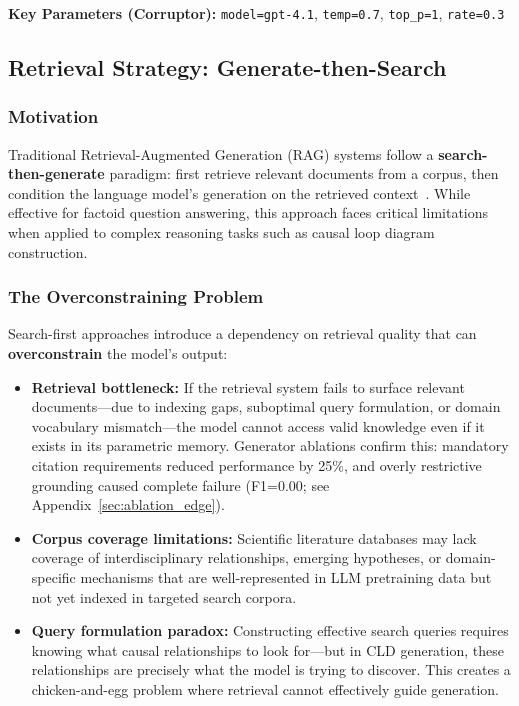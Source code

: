 \textbf{Key Parameters (Corruptor):} \texttt{model=gpt-4.1}, \texttt{temp=0.7}, \texttt{top\_p=1}, \texttt{rate=0.3}

\subsection{Retrieval Strategy: Generate-then-Search}
\label{sec:retrieval_strategy}

\subsubsection{Motivation}

Traditional Retrieval-Augmented Generation (RAG) systems follow a \textbf{search-then-generate} paradigm: first retrieve relevant documents from a corpus, then condition the language model's generation on the retrieved context~\cite{lewis2020rag}. While effective for factoid question answering, this approach faces critical limitations when applied to complex reasoning tasks such as causal loop diagram construction.

\subsubsection{The Overconstraining Problem}

Search-first approaches introduce a dependency on retrieval quality that can \textbf{overconstrain} the model's output:

\begin{itemize}[noitemsep]
    \item \textbf{Retrieval bottleneck:} If the retrieval system fails to surface relevant documents---due to indexing gaps, suboptimal query formulation, or domain vocabulary mismatch---the model cannot access valid knowledge even if it exists in its parametric memory. Generator ablations confirm this: mandatory citation requirements reduced performance by 25\%, and overly restrictive grounding caused complete failure (F1=0.00; see Appendix~\ref{sec:ablation_edge}).
    \item \textbf{Corpus coverage limitations:} Scientific literature databases may lack coverage of interdisciplinary relationships, emerging hypotheses, or domain-specific mechanisms that are well-represented in LLM pretraining data but not yet indexed in targeted search corpora.
    \item \textbf{Query formulation paradox:} Constructing effective search queries requires knowing what causal relationships to look for---but in CLD generation, these relationships are precisely what the model is trying to discover. This creates a chicken-and-egg problem where retrieval cannot effectively guide generation.
\end{itemize}

